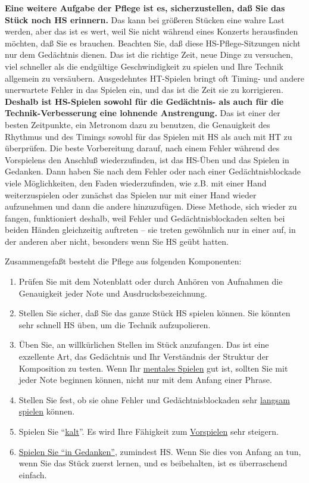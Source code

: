 \textbf{Eine weitere Aufgabe der Pflege ist es, sicherzustellen, daß Sie das Stück noch HS erinnern.}
Das kann bei größeren Stücken eine wahre Last werden, aber das ist es wert, weil Sie nicht während eines Konzerts herausfinden möchten, daß Sie es brauchen.
Beachten Sie, daß diese HS-Pflege-Sitzungen nicht nur dem Gedächtnis dienen.
Das ist die richtige Zeit, neue Dinge zu versuchen, viel schneller als die endgültige Geschwindigkeit zu spielen und Ihre Technik allgemein zu versäubern.
Ausgedehntes HT-Spielen bringt oft Timing- und andere unerwartete Fehler in das Spielen ein, und das ist die Zeit sie zu korrigieren.
\textbf{Deshalb ist HS-Spielen sowohl für die Gedächtnis- als auch für die Technik-Verbesserung eine lohnende Anstrengung.}
Das ist einer der besten Zeitpunkte, ein Metronom dazu zu benutzen, die Genauigkeit des Rhythmus und des Timings sowohl für das Spielen mit HS als auch mit HT zu überprüfen.
Die beste Vorbereitung darauf, nach einem Fehler während des Vorspielens den Anschluß wiederzufinden, ist das HS-Üben und das Spielen in Gedanken.
Dann haben Sie nach dem Fehler oder nach einer Gedächtnisblockade viele Möglichkeiten, den Faden wiederzufinden, wie z.B. mit einer Hand weiterzuspielen oder zunächst das Spielen nur mit einer Hand wieder aufzunehmen und dann die andere hinzuzufügen.
Diese Methode, sich wieder zu fangen, funktioniert deshalb, weil Fehler und Gedächtnisblockaden selten bei beiden Händen gleichzeitig auftreten -- sie treten gewöhnlich nur in einer auf, in der anderen aber nicht, besonders wenn Sie HS geübt hatten.

Zusammengefaßt besteht die Pflege aus folgenden Komponenten:

\begin{enumerate}[label={\arabic*.}] 
\item Prüfen Sie mit dem Notenblatt oder durch Anhören von Aufnahmen die Genauigkeit jeder Note und Ausdrucksbezeichnung.
\item Stellen Sie sicher, daß Sie das ganze Stück HS spielen können.
Sie könnten sehr schnell HS üben, um die Technik aufzupolieren.
\item Üben Sie, an willkürlichen Stellen im Stück anzufangen.
Das ist eine exzellente Art, das Gedächtnis und Ihr Verständnis der Struktur der Komposition zu testen.
Wenn Ihr \hyperref[c1iii6tastatur]{mentales Spielen} gut ist, sollten Sie mit jeder Note beginnen können, nicht nur mit dem Anfang einer Phrase.
\item Stellen Sie fest, ob sie ohne Fehler und Gedächtnisblockaden sehr \hyperref[c1iii6h]{langsam spielen} können.
\item Spielen Sie \enquote{\hyperref[c1iii6g]{kalt}}. Es wird Ihre Fähigkeit zum \hyperref[c1iii14]{Vorspielen} sehr steigern.
\item \hyperref[c1iii6tastatur]{Spielen Sie \enquote{in Gedanken}}, zumindest HS.
Wenn Sie dies von Anfang an tun, wenn Sie das Stück zuerst lernen, und es beibehalten, ist es überraschend einfach.
\end{enumerate} 


